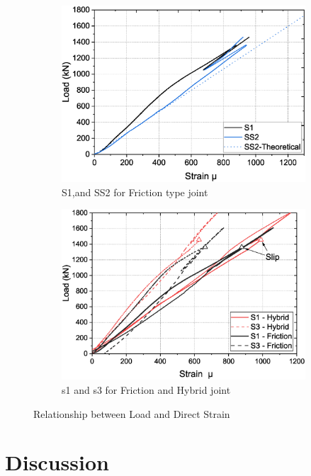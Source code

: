\begin{figure}
\centering
    \begin{subfigure}[t]{0.6\textwidth}
        \includegraphics[width=\linewidth]{imgs/ch6/S1SS2-F.eps}
        \caption{S1,and SS2 for Friction type joint}
        \label{fig-s1ss2}
    \end{subfigure}
    \hfill
    \begin{subfigure}[t]{0.6\textwidth}
        \includegraphics[width=\linewidth]{imgs/ch6/S3-FH.eps}
        \caption{s1 and s3 for Friction and Hybrid joint}
        \label{fig-s3FH}
    \end{subfigure}
    \caption{Relationship between Load and Direct Strain}
    \label{fig-LS}
\end{figure}

\section{Discussion}

